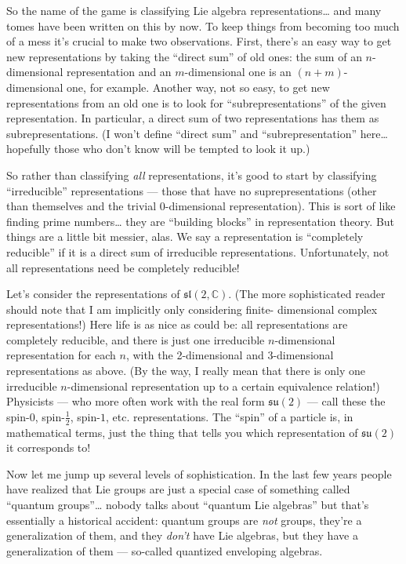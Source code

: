 \documentclass[12pt]{article}
\begin{document}
So the name of the game is classifying Lie algebra
representations\ldots{} and many tomes have been written on this by now.
To keep things from becoming too much of a mess it's crucial to make two
observations. First, there's an easy way to get new representations by
taking the ``direct sum'' of old ones: the sum of an \(n\)-dimensional
representation and an \(m\)-dimensional one is an \((n+m)\)-dimensional
one, for example. Another way, not so easy, to get new representations
from an old one is to look for ``subrepresentations'' of the given
representation. In particular, a direct sum of two representations has
them as subrepresentations. (I won't define ``direct sum'' and
``subrepresentation'' here\ldots{} hopefully those who don't know will
be tempted to look it up.)

So rather than classifying \emph{all} representations, it's good to
start by classifying ``irreducible'' representations --- those that have
no suprepresentations (other than themselves and the trivial
0-dimensional representation). This is sort of like finding prime
numbers\ldots{} they are ``building blocks'' in representation theory.
But things are a little bit messier, alas. We say a representation is
``completely reducible'' if it is a direct sum of irreducible
representations. Unfortunately, not all representations need be
completely reducible!

Let's consider the representations of \(\mathfrak{sl}(2,\mathbb{C})\).
(The more sophisticated reader should note that I am implicitly only
considering finite- dimensional complex representations!) Here life is
as nice as could be: all representations are completely reducible, and
there is just one irreducible \(n\)-dimensional representation for each
\(n\), with the 2-dimensional and \(3\)-dimensional representations as
above. (By the way, I really mean that there is only one irreducible
\(n\)-dimensional representation up to a certain equivalence relation!)
Physicists --- who more often work with the real form
\(\mathfrak{su}(2)\) --- call these the spin-\(0\), spin-\(\frac{1}{2}\),
spin-\(1\), etc. representations. The ``spin'' of a particle is, in
mathematical terms, just the thing that tells you which representation
of \(\mathfrak{su}(2)\) it corresponds to!

Now let me jump up several levels of sophistication. In the last few
years people have realized that Lie groups are just a special case of
something called ``quantum groups''\ldots{} nobody talks about ``quantum
Lie algebras'' but that's essentially a historical accident: quantum
groups are \emph{not} groups, they're a generalization of them, and they 
\emph{don't} have Lie algebras, but they have a generalization of them --- so-called
quantized enveloping algebras.
\end{document}
